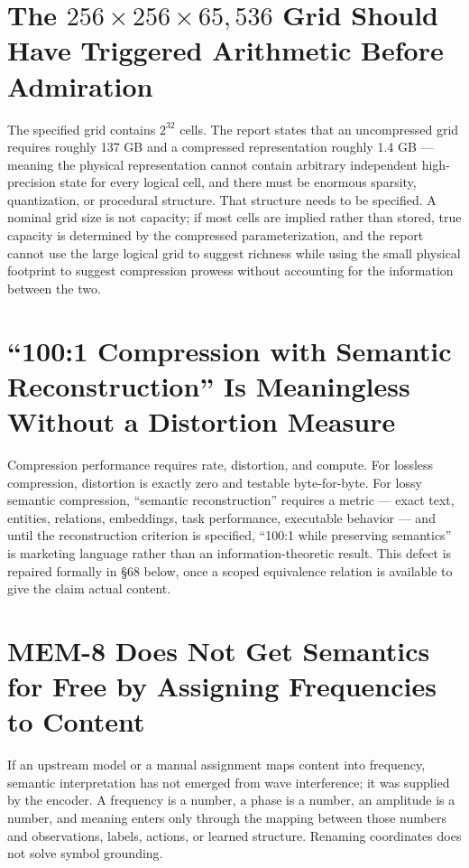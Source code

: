 \documentclass[12pt]{article}
\begin{document}
\section{The $256\times256\times65{,}536$ Grid Should Have Triggered Arithmetic Before Admiration}

The specified grid contains $2^{32}$ cells. The report states that an uncompressed grid requires roughly 137 GB and a compressed representation roughly 1.4 GB — meaning the physical representation cannot contain arbitrary independent high-precision state for every logical cell, and there must be enormous sparsity, quantization, or procedural structure. That structure needs to be specified. A nominal grid size is not capacity; if most cells are implied rather than stored, true capacity is determined by the compressed parameterization, and the report cannot use the large logical grid to suggest richness while using the small physical footprint to suggest compression prowess without accounting for the information between the two.

\section{``100:1 Compression with Semantic Reconstruction'' Is Meaningless Without a Distortion Measure}

Compression performance requires rate, distortion, and compute. For lossless compression, distortion is exactly zero and testable byte-for-byte. For lossy semantic compression, ``semantic reconstruction'' requires a metric — exact text, entities, relations, embeddings, task performance, executable behavior — and until the reconstruction criterion is specified, ``100:1 while preserving semantics'' is marketing language rather than an information-theoretic result. This defect is repaired formally in \S68 below, once a scoped equivalence relation is available to give the claim actual content.

\section{MEM-8 Does Not Get Semantics for Free by Assigning Frequencies to Content}

If an upstream model or a manual assignment maps content into frequency, semantic interpretation has not emerged from wave interference; it was supplied by the encoder. A frequency is a number, a phase is a number, an amplitude is a number, and meaning enters only through the mapping between those numbers and observations, labels, actions, or learned structure. Renaming coordinates does not solve symbol grounding.
\end{document}
